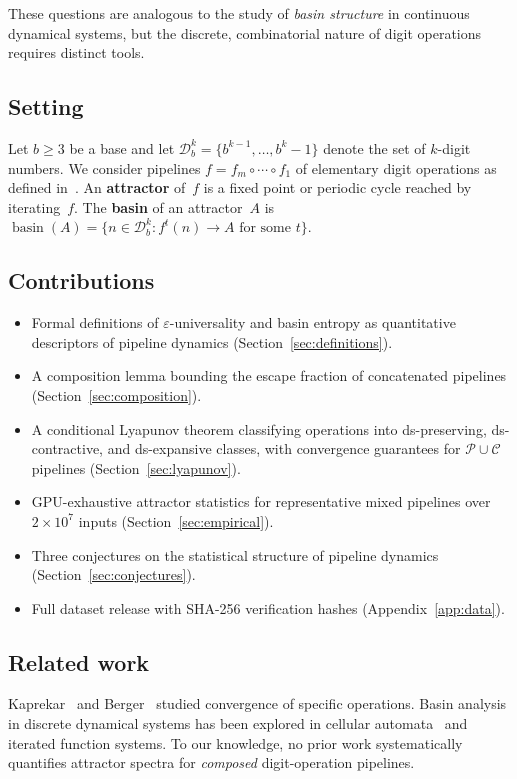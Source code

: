 \documentclass[11pt,a4paper]{amsart}
\theoremstyle{plain}
\theoremstyle{definition}
\theoremstyle{remark}
\DeclareMathOperator{\basin}{basin}
\begin{document}
These questions are analogous to the study of \emph{basin structure} in
continuous dynamical systems, but the discrete, combinatorial nature of
digit operations requires distinct tools.

\subsection{Setting}

Let $b \geq 3$ be a base and let $\mathcal{D}_b^k = \{b^{k-1}, \ldots,
b^k - 1\}$ denote the set of $k$-digit numbers. We consider pipelines
$f = f_m \circ \cdots \circ f_1$ of elementary digit operations as
defined in~\cite{PaperA}. An \textbf{attractor} of~$f$ is a fixed point
or periodic cycle reached by iterating~$f$. The \textbf{basin} of an
attractor~$A$ is $\basin(A) = \{n \in \mathcal{D}_b^k : f^t(n) \to A
\text{ for some } t\}$.

\subsection{Contributions}

\begin{itemize}
\item Formal definitions of $\varepsilon$-universality and basin entropy
  as quantitative descriptors of pipeline dynamics
  (Section~\ref{sec:definitions}).
\item A composition lemma bounding the escape fraction of concatenated
  pipelines (Section~\ref{sec:composition}).
\item A conditional Lyapunov theorem classifying operations into
  ds-preserving, ds-contractive, and ds-expansive classes, with
  convergence guarantees for $\mathcal{P} \cup \mathcal{C}$ pipelines
  (Section~\ref{sec:lyapunov}).
\item GPU-exhaustive attractor statistics for representative mixed
  pipelines over $2 \times 10^7$ inputs (Section~\ref{sec:empirical}).
\item Three conjectures on the statistical structure of pipeline dynamics
  (Section~\ref{sec:conjectures}).
\item Full dataset release with SHA-256 verification hashes
  (Appendix~\ref{app:data}).
\end{itemize}

\subsection{Related work}
Kaprekar~\cite{Kaprekar1955} and Berger~\cite{Berger1992} studied
convergence of specific operations. Basin analysis in discrete dynamical
systems has been explored in cellular automata~\cite{Wolfram2002} and
iterated function systems. To our knowledge, no prior work systematically
quantifies attractor spectra for \emph{composed} digit-operation pipelines.
\end{document}
